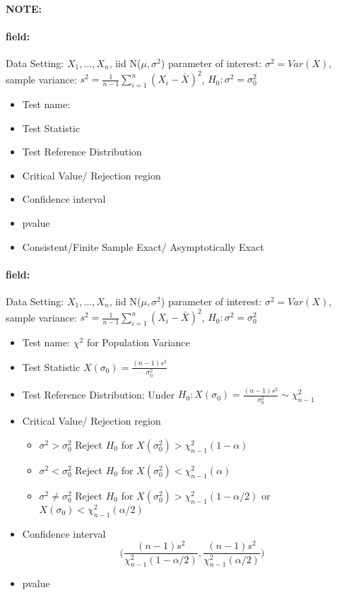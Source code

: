 \documentclass[12pt]{article}
\newenvironment{note}{\paragraph{NOTE:}}{}
\newenvironment{field}{\paragraph{field:}}{}
\begin{document}
\begin{note}
  \begin{field}
    Data Setting: $X_1, \ldots, X_n$, iid N($\mu,\sigma^2$) parameter of interest: $\sigma^2 = Var(X)$, sample variance: $s^2 = \frac{1}{n-1} \sum_{i=1}^n(X_i - \bar{X})^2$, $H_0: \sigma^2 = \sigma_0^2$
    \begin{itemize}
      \item Test name:
      \item Test Statistic
      \item Test Reference Distribution
      \item Critical Value/ Rejection region
      \item Confidence interval
      \item pvalue
      \item Consistent/Finite Sample Exact/ Asymptotically Exact
    \end{itemize}
  \end{field}
  \begin{field}
    Data Setting: $X_1, \ldots, X_n$, iid N($\mu,\sigma^2$) parameter of interest: $\sigma^2 = Var(X)$, sample variance: $s^2 = \frac{1}{n-1} \sum_{i=1}^n(X_i - \bar{X})^2$, $H_0: \sigma^2 = \sigma_0^2$
    \begin{itemize}
      \item Test name: $\chi^2$ for Population Variance
      \item Test Statistic $X(\sigma_0) = \frac{(n-1)s^2}{\sigma_0^2}$
      \item Test Reference Distribution: Under $H_0: X(\sigma_0) = \frac{(n-1)s^2}{\sigma_0^2} \sim \chi_{n-1}^2$
      \item Critical Value/ Rejection region
            \begin{itemize}
              \item  $\sigma^2 > \sigma_0^2$ Reject $H_0$ for $X(\sigma_0^2) > \chi^2_{n-1}(1-\alpha)$
              \item $\sigma^2 < \sigma_0^2$ Reject $H_0$ for $X(\sigma_0^2) < \chi^2_{n-1}(\alpha)$
              \item $\sigma^2 \neq \sigma_0^2$ Reject $H_0$ for $X(\sigma_0^2) > \chi^2_{n-1}(1 - \alpha/2)$ or $X(\sigma_0) < \chi^2_{n-1}(\alpha/2)$
            \end{itemize}
      \item Confidence interval  $$ \bigg( \frac{(n-1)s^2}{\chi^2_{n-1}(1 - \alpha/2)}, \frac{(n-1)s^2}{\chi^2_{n-1}(\alpha/2)}\bigg)$$
      \item pvalue

\end{itemize}
\end{field}
\end{note}
\end{document}
